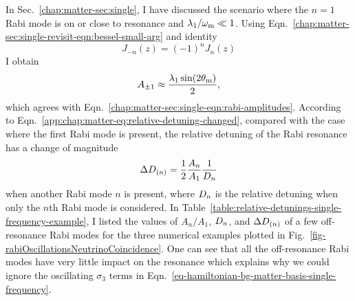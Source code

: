 In Sec.~\ref{chap:matter-sec:single}, I have discussed the scenario where the $n=1$ Rabi mode is on or close to resonance and $\lambda_1/\omega_\mathrm m \ll 1$. Using Eqn.~\ref{chap:matter-sec:single-revisit-eqn:bessel-small-arg} and identity
\begin{equation}
    J_{-n}(z) =(-1)^n J_{n}(z)
\end{equation}
I obtain
\begin{equation}
    A_{\pm 1} \approx \frac{ \lambda_1 \sin (2\theta_\mathrm m)}{2},
\end{equation}
which agrees with Eqn.~\ref{chap:matter-sec:single-eqn:rabi-amplitudes}. According to Eqn.~\ref{app:chap:matter-eq:relative-detuning-changed}, compared with the case where the first Rabi mode is present, the relative detuning of the Rabi resonance has a change of magnitude
\begin{equation}
\Delta D_{(n)} = \frac{1}{2} \frac{A_n}{A_1} \frac{1}{D_n}
\end{equation}
when another Rabi mode $n$ is present, where $D_n$ is the relative detuning when only the $n$th Rabi mode is considered. In Table~\ref{table:relative-detunings-single-frequency-example}, I listed the values of $A_n/A_1$, $D_n$, and $\Delta D_{(n)}$ of a few off-resonance Rabi modes for the three numerical examples plotted in Fig.~\ref{fig-rabiOscillationsNeutrinoCoincidence}. One can see that all the off-resonance Rabi modes have very little impact on the resonance which explains why we could ignore the oscillating $\sigma_3$ terms in Eqn.~\ref{eq-hamiltonian-bg-matter-basis-single-frequency}.



